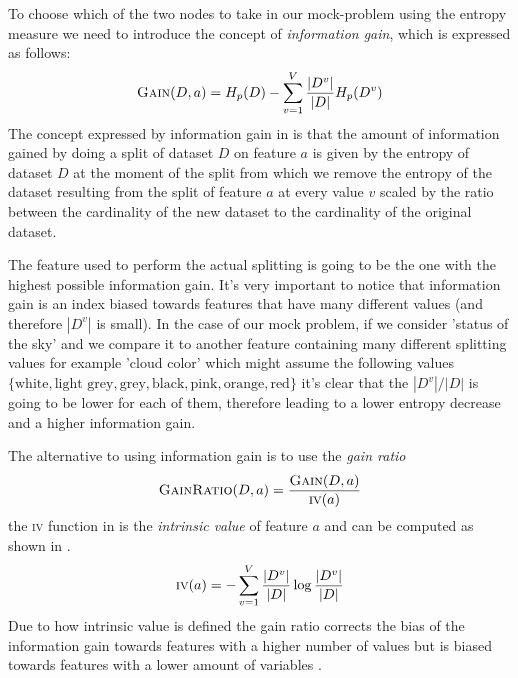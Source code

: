 \smallskip

To choose which of the two nodes to take in our mock-problem using the entropy measure we need to
introduce the concept of \emph{information gain}, which is expressed as follows:
\begin{equation}
	\label{eq:information-gain}
	\textsc{Gain}(D, a) = H_p(D) - \sum_{v = 1}^V\frac{|D^v|}{|D|}H_p(D^v)
\end{equation}
The concept expressed by information gain in  is that the amount of
information gained by doing a split of dataset $D$ on feature $a$ is given by the entropy of dataset
$D$ at the moment of the split from which we remove the entropy of the dataset resulting from the
split of feature $a$ at every value $v$ scaled by the ratio between the cardinality of the new dataset to
the cardinality of the original dataset.

\smallskip

The feature used to perform the actual splitting is going to be the one with the highest possible
information gain. It's very important to notice that information gain is an index biased towards
features that have many different values (and therefore $|D^v|$ is small). In the case of our mock
problem, if we consider 'status of the sky' and we compare it to another feature containing many
different splitting values for example 'cloud color' which might assume the following values
$\{\text{white}, \text{light grey}, \text{grey}, \text{black}, \text{pink}, \text{orange},
	\text{red}\}$ it's clear that the $|D^v|/|D|$ is going to be lower for each of them, therefore
leading to a lower entropy decrease and a higher information gain.

\medskip

The alternative to using information gain is to use the \emph{gain ratio}
\begin{equation}
	\label{eq:gain-ratio}
	\textsc{GainRatio}(D, a) = \frac{\textsc{Gain}(D, a)}{\textsc{iv}(a)}
\end{equation}
the \textsc{iv} function in  is the \emph{intrinsic value} of feature $a$ and
can be computed as shown in .
\begin{equation}
	\label{eq:intrinsic-value}
	\textsc{iv}(a) = - \sum_{v = 1}^V\frac{|D^v|}{|D|} \log{\frac{|D^v|}{|D|}}
\end{equation}
Due to how intrinsic value is defined the gain ratio corrects the bias of the information gain towards features
with a higher number of values but is biased towards features with a lower amount of variables
\cite{ZhouZhi-Hua2021ML}.

